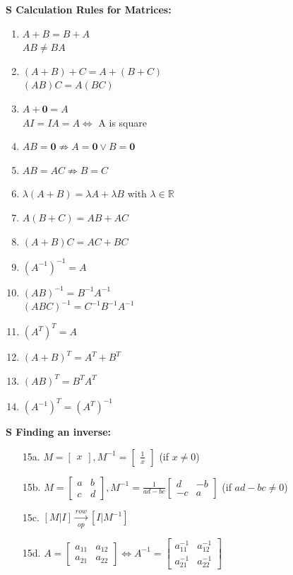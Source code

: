 \documentclass[7pt,landscape, margin = 0.1mm]{article}
\newcommand{\SA}[2]{\color{chaptercolor}\bf{S #1}:\color{black}    \hspace{0.2cm} #2}
\begin{document}
\begin{multicols}{4}
\begin{flushleft}
{{\SA{Calculation Rules for Matrices}{
\begin{enumerate}[nolistsep]
 \item $A+B=B+A$\\ $AB \neq BA$
 \item $(A+B)+C= A+(B+C)$\\ $(AB)C=A(BC)$
 \item $A+\bm{0}=A$\\ $AI=IA=A \iff$ A is square
 \item $AB=\bm{0} \not\Rightarrow A=\bm{0} \lor B=\bm{0}$
 \item $AB=AC \not\Rightarrow B=C$
 \item $\lambda (A+B)= \lambda A + \lambda B$ with $\lambda \in \mathbb{R}$
 \item $A(B+C)=AB+AC$
 \item $(A+B)C=AC+BC$
 \item $(A^{-1})^{-1}=A$
 \item $(AB)^{-1}=B^{-1}A^{-1}$\\$(ABC)^{-1}=C^{-1}B^{-1}A^{-1}$
 \item $(A^T)^T=A$
 \item $(A+B)^T=A^T+B^T$
 \item $(AB)^T=B^TA^T$
 \item $(A^{-1})^T=(A^T)^{-1}$
\end{enumerate}

\SA{Finding an inverse}{
\begin{enumerate}[nolistsep]
 \item[15a.] $M=\begin{bmatrix}
     x
 \end{bmatrix}, M^{-1}=\begin{bmatrix}
     \frac{1}{x}
 \end{bmatrix}$ (if $x \not = 0$)
 \item[15b.] $M=\begin{bmatrix}
     a & b\\
     c & d
 \end{bmatrix}, M^{-1}=\frac{1}{ad-bc}\begin{bmatrix}
     d & -b\\
     -c & a
 \end{bmatrix}$ (if $ad-bc \not = 0$)
 \item[15c.] $[M|I] \xrightarrow[op]{row}[I|M^{-1}]$
 \item[15d.] $ A =  \left[ 
 \begin{array}{c|c} 
  a_{11} & a_{12} \\ 
  \hline 
  a_{21} & a_{22} 
 \end{array} 
 \right] \Leftrightarrow A^{-1} = \left[ 
 \begin{array}{c|c} 
  a_{11}^{-1}  & a_{12}^{-1}  \\ 
  \hline 
  a_{21}^{-1}  & a_{22} ^{-1} 
 \end{array} 
 \right] $
 \end{enumerate}
}}


}}
\end{flushleft}
\end{multicols}
\end{document}
